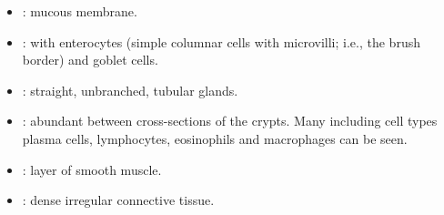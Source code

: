\begin{itemize}
\begin{itemize}
  \end{itemize}

  \bigskip

  \begin{multicols}{2}
  \begin{itemize}
    \item {}: mucous membrane.
    
    \begin{center}
    \end{center}
    
    \item {}: with enterocytes (simple columnar cells with microvilli; i.e., the brush border) and goblet cells.
    
    \begin{center}
    \end{center}
    
    \item {}:  straight, unbranched, tubular glands.
    
    \begin{center}
    \end{center}
    
    \item {}: abundant between cross-sections of the crypts. Many including cell types plasma cells, lymphocytes, eosinophils and macrophages can be seen.
    
    \begin{center}
    \end{center}
    
    \item {}: layer of smooth muscle.
    
    \begin{center}
    \end{center}
    
    \item {}: dense irregular connective tissue. 
    
    \begin{center}
    \end{center}
    

\end{itemize}
\end{multicols}
\end{itemize}
